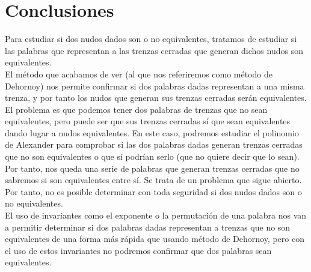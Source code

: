 \newpage
\section{Conclusiones}
Para estudiar si dos nudos dados son o no equivalentes, tratamos de estudiar si las palabras que representan a las trenzas cerradas que generan dichos nudos son equivalentes. \\

El método que acabamos de ver (al que nos referiremos como método de Dehornoy) nos permite confirmar si dos palabras dadas representan a una misma trenza, y por tanto los nudos que generan sus trenzas cerradas serán equivalentes.\\

El problema es que podemos tener dos palabras de trenzas que no sean equivalentes, pero puede ser que sus trenzas cerradas sí que sean equivalentes dando lugar a nudos equivalentes. En este caso, podremos estudiar el polinomio de Alexander para comprobar si las dos palabras dadas generan trenzas cerradas que no son equivalentes o que sí podrían serlo (que no quiere decir que lo sean).\\

Por tanto, nos queda una serie de palabras que generan trenzas cerradas que no sabremos si son equivalentes entre sí. Se trata de un problema que sigue abierto. Por tanto, no es posible determinar con toda seguridad si dos nudos dados son o no equivalentes. \\

El uso de invariantes como el exponente o la permutación de una palabra nos van a permitir determinar si dos palabras dadas representan a trenzas que no son equivalentes de una forma más rápida que usando método de Dehornoy, pero con el uso de estos invariantes no podremos confirmar que dos palabras sean equivalentes.\\ 


